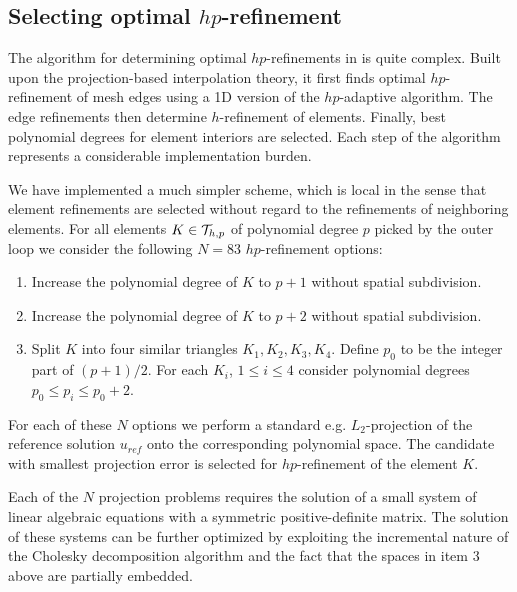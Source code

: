 \subsection{Selecting optimal $hp$-refinement}

The algorithm for determining optimal $hp$-refinements in \cite{derade} is 
quite complex. Built upon the projection-based interpolation theory,
it first finds optimal $hp$-refinement of mesh edges using a 1D
version of the $hp$-adaptive algorithm. The edge refinements then
determine $h$-refinement of elements. Finally, best polynomial
degrees for element interiors are selected. Each step of the algorithm
represents a considerable implementation burden.

We have implemented a much simpler scheme, which is local in the sense
that element refinements are selected without regard to the refinements
of neighboring elements. For all elements $K\in {\cal{T}}_{h,p}$ of polynomial
degree $p$ picked by the outer loop we consider the following 
$N = 83$ $hp$-refinement options:
\begin{enumerate}
\item Increase the polynomial degree of $K$ to $p+1$ without spatial subdivision.
\item Increase the polynomial degree of $K$ to $p+2$ without spatial subdivision.
\item Split $K$ into four similar triangles $K_1, K_2, K_3, K_4$.
      Define $p_0$ to be the integer part of $(p+1)/2$.
      For each $K_i$, $1 \le i \le 4$ consider polynomial
      degrees $p_0 \le p_i \le p_0 + 2$.
\end{enumerate}
For each of these $N$ options we perform a standard e.g. $L_2$-projection
of the reference solution $u_{ref}$ onto the corresponding polynomial
space. The candidate with smallest projection error is selected
for $hp$-refinement of the element $K$.

Each of the $N$ projection problems requires the solution of a small
system of linear algebraic equations with a symmetric positive-definite
matrix. The solution of these systems can be further optimized by exploiting
the incremental nature of the Cholesky decomposition algorithm 
and the fact that the spaces in item 3 above are partially embedded.
